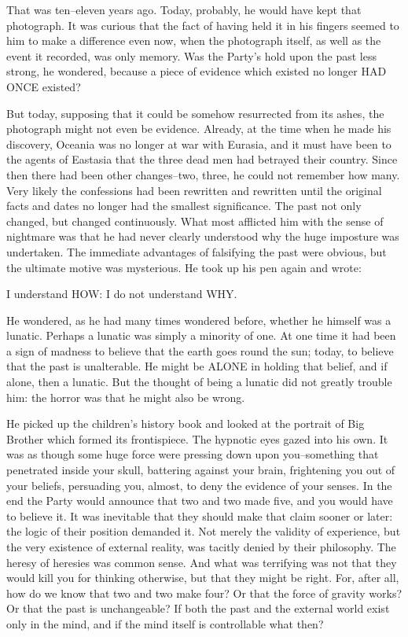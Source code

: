 \documentclass{article}
\begin{document}
That was ten--eleven years ago. Today, probably, he would have kept that
photograph. It was curious that the fact of having held it in his fingers
seemed to him to make a difference even now, when the photograph itself,
as well as the event it recorded, was only memory. Was the Party's hold
upon the past less strong, he wondered, because a piece of evidence which
existed no longer HAD ONCE existed?

But today, supposing that it could be somehow resurrected from its ashes,
the photograph might not even be evidence. Already, at the time when he
made his discovery, Oceania was no longer at war with Eurasia, and it must
have been to the agents of Eastasia that the three dead men had betrayed
their country. Since then there had been other changes--two, three,
he could not remember how many. Very likely the confessions had been
rewritten and rewritten until the original facts and dates no longer
had the smallest significance. The past not only changed, but changed
continuously. What most afflicted him with the sense of nightmare was that
he had never clearly understood why the huge imposture was undertaken.
The immediate advantages of falsifying the past were obvious, but the
ultimate motive was mysterious. He took up his pen again and wrote:


   I understand HOW: I do not understand WHY.


He wondered, as he had many times wondered before, whether he himself was
a lunatic. Perhaps a lunatic was simply a minority of one. At one time it
had been a sign of madness to believe that the earth goes round the sun;
today, to believe that the past is unalterable. He might be ALONE in
holding that belief, and if alone, then a lunatic. But the thought of being
a lunatic did not greatly trouble him: the horror was that he might also
be wrong.

He picked up the children's history book and looked at the portrait of
Big Brother which formed its frontispiece. The hypnotic eyes gazed into
his own. It was as though some huge force were pressing down upon
you--something that penetrated inside your skull, battering against your
brain, frightening you out of your beliefs, persuading you, almost, to
deny the evidence of your senses. In the end the Party would announce that
two and two made five, and you would have to believe it. It was inevitable
that they should make that claim sooner or later: the logic of their
position demanded it. Not merely the validity of experience, but the very
existence of external reality, was tacitly denied by their philosophy. The
heresy of heresies was common sense. And what was terrifying was not that
they would kill you for thinking otherwise, but that they might be right.
For, after all, how do we know that two and two make four? Or that the
force of gravity works? Or that the past is unchangeable? If both the past
and the external world exist only in the mind, and if the mind itself is
controllable what then?
\end{document}
